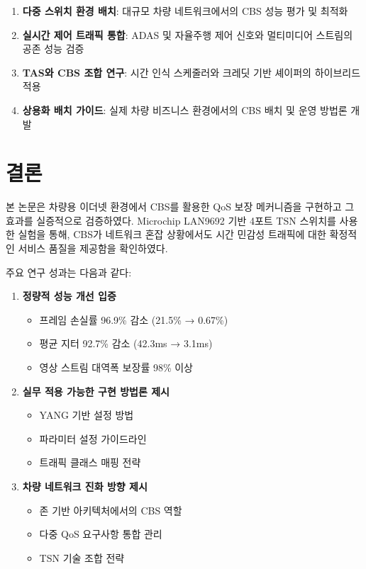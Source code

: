 \documentclass[10pt,twocolumn]{IEEEtran}
\begin{document}
\begin{enumerate}
\item \textbf{다중 스위치 환경 배치}: 대규모 차량 네트워크에서의 CBS 성능 평가 및 최적화
\item \textbf{실시간 제어 트래픽 통합}: ADAS 및 자율주행 제어 신호와 멀티미디어 스트림의 공존 성능 검증
\item \textbf{TAS와 CBS 조합 연구}: 시간 인식 스케줄러와 크레딧 기반 셰이퍼의 하이브리드 적용
\item \textbf{상용화 배치 가이드}: 실제 차량 비즈니스 환경에서의 CBS 배치 및 운영 방법론 개발
\end{enumerate}

\section{결론}

본 논문은 차량용 이더넷 환경에서 CBS를 활용한 QoS 보장 메커니즘을 구현하고 그 효과를 실증적으로 검증하였다. Microchip LAN9692 기반 4포트 TSN 스위치를 사용한 실험을 통해, CBS가 네트워크 혼잡 상황에서도 시간 민감성 트래픽에 대한 확정적인 서비스 품질을 제공함을 확인하였다.

주요 연구 성과는 다음과 같다:

\begin{enumerate}
\item \textbf{정량적 성능 개선 입증}
   \begin{itemize}
   \item 프레임 손실률 96.9\% 감소 (21.5\% → 0.67\%)
   \item 평균 지터 92.7\% 감소 (42.3ms → 3.1ms)
   \item 영상 스트림 대역폭 보장률 98\% 이상
   \end{itemize}

\item \textbf{실무 적용 가능한 구현 방법론 제시}
   \begin{itemize}
   \item YANG 기반 설정 방법
   \item 파라미터 설정 가이드라인
   \item 트래픽 클래스 매핑 전략
   \end{itemize}

\item \textbf{차량 네트워크 진화 방향 제시}
   \begin{itemize}
   \item 존 기반 아키텍처에서의 CBS 역할
   \item 다중 QoS 요구사항 통합 관리
   \item TSN 기술 조합 전략
   \end{itemize}
\end{enumerate}
\end{document}
